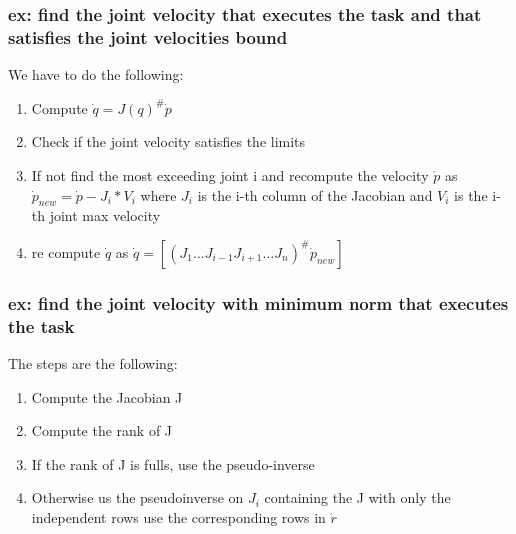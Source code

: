\documentclass[a4paper,12pt]{article}
\begin{document}
\subsubsection{ex: find the joint velocity that executes the task and that satisfies the joint velocities bound}
We have to do the following:
\begin{enumerate}
    \item Compute $\dot{q}=J(q)^{\#}\dot{p}$
    \item Check if the joint velocity satisfies the limits
    \item If not find  the most exceeding joint i and recompute the 
    velocity $\dot{p}$ as $\dot{p}_{new}=\dot{p} - J_i*V_i$
    where $J_i$ is the i-th column of the Jacobian and $V_i$ is 
    the i-th joint max velocity
    \item re compute $\dot{q}$ as $\dot{q}=[(J_1 \dots J_{i-1}J_{i+1} \dots J_n)^{\#}\dot{p}_{new}]$
\end{enumerate}




 \subsubsection{ex: find the joint velocity with minimum 
 norm that executes the task}
    The steps are the following:
    \begin{enumerate}
        \item Compute the Jacobian J
        \item Compute the rank of J
        \item If the rank of J is fulls, use the pseudo-inverse
        \item Otherwise us the pseudoinverse on $J_i$ containing the J
         with only the independent rows use the corresponding rows in $\dot{r}$
    \end{enumerate}
\end{document}
